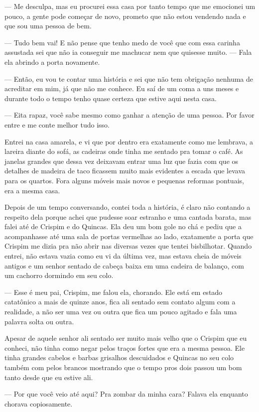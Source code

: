 — Me desculpa, mas eu procurei essa casa por tanto tempo que me emocionei um pouco, a gente pode começar de novo, prometo que não estou vendendo nada e que sou uma pessoa de bem.

— Tudo bem vai! E não pense que tenho medo de você que com essa carinha assustada sei que não ia conseguir me machucar nem que quisesse muito. — Fala ela abrindo a porta novamente.

— Então, eu vou te contar uma história e sei que não tem obrigação nenhuma de acreditar em mim, já que não me conhece. Eu saí de um coma a uns meses e durante todo o tempo tenho quase certeza que estive aqui nesta casa.

— Eita rapaz, você sabe mesmo como ganhar a atenção de uma pessoa. Por favor entre e me conte melhor tudo isso.

Entrei na casa amarela, e vi que por dentro era exatamente como me lembrava, a lareira diante do sofá, as cadeiras onde tinha me sentado pra tomar o café. As janelas grandes que dessa vez deixavam entrar uma luz que fazia com que os detalhes de madeira de taco ficassem muito mais evidentes a escada que levava para os quartos. Fora alguns móveis mais novos e pequenas reformas pontuais, era a mesma casa.

Depois de um tempo conversando, contei toda a história, é claro não contando a respeito dela porque achei que pudesse soar estranho e uma cantada barata, mas falei até de Crispim e do Quincas. Ela deu um bom gole no chá e pediu que a acompanhasse até uma sala de portas vermelhas ao lado, exatamente a porta que Crispim me dizia pra não abrir nas diversas vezes que tentei bisbilhotar. Quando entrei, não estava vazia como eu vi da última vez, mas estava cheia de móveis antigos e um senhor sentado de cabeça baixa em uma cadeira de balanço, com um cachorro dormindo em seu colo.

— Esse é meu pai, Crispim, me falou ela, chorando. Ele está em estado catatônico a mais de quinze anos, fica ali sentado sem contato algum com a realidade, a não ser uma vez ou outra que fica um pouco agitado e fala uma palavra solta ou outra.

Apesar de aquele senhor ali sentado ser muito mais velho que o Crispim que eu conheci, não tinha como negar pelos traços fortes que era a mesma pessoa. Ele tinha grandes cabelos e barbas grisalhos descuidados e Quincas no seu colo também com pelos brancos mostrando que o tempo pros dois passou um bom tanto desde que eu estive ali.

— Por que você veio até aqui? Pra zombar da minha cara? Falava ela enquanto chorava copiosamente.

